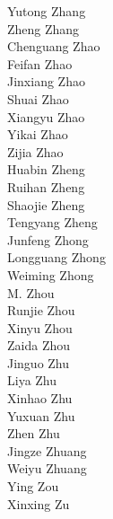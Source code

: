 Yutong Zhang\\
Zheng Zhang\\
Chenguang Zhao\\
Feifan Zhao\\
Jinxiang Zhao\\
Shuai Zhao\\
Xiangyu Zhao\\
Yikai Zhao\\
Zijia Zhao\\
Huabin Zheng\\
Ruihan Zheng\\
Shaojie Zheng\\
Tengyang Zheng\\
Junfeng Zhong\\
Longguang Zhong\\
Weiming Zhong\\
M. Zhou\\
Runjie Zhou\\
Xinyu Zhou\\
Zaida Zhou\\
Jinguo Zhu\\
Liya Zhu\\
Xinhao Zhu\\
Yuxuan Zhu\\
Zhen Zhu\\
Jingze Zhuang\\
Weiyu Zhuang\\
Ying Zou\\
Xinxing Zu\\